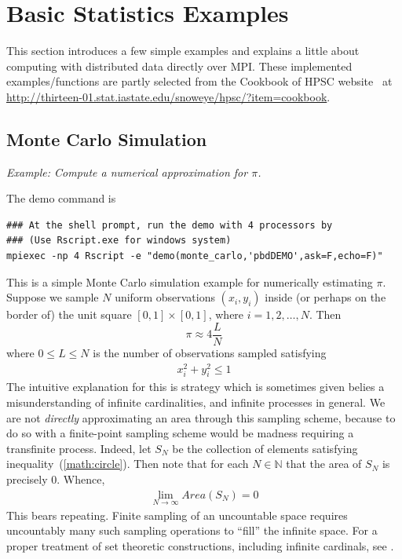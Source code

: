 \chapter[Basic Statistics Examples]{Basic Statistics Examples}
\label{sec:statistics_examples}

This section introduces a few simple examples and explains a little about computing with 
distributed data directly over MPI. 
These implemented examples/functions are partly
selected from the Cookbook of HPSC website~\citep{hpsc2011} at
\url{http://thirteen-01.stat.iastate.edu/snoweye/hpsc/?item=cookbook}.



\section[Monte Carlo Simulation]{Monte Carlo Simulation}%
\label{sec:monte_carlo}

\emph{Example:  Compute a numerical approximation for $\pi$.}

The demo command is
\begin{lstlisting}
### At the shell prompt, run the demo with 4 processors by
### (Use Rscript.exe for windows system)
mpiexec -np 4 Rscript -e "demo(monte_carlo,'pbdDEMO',ask=F,echo=F)"
\end{lstlisting}

This is a simple Monte Carlo simulation example for numerically estimating $\pi$.
Suppose we sample $N$ uniform observations $(x_i, y_i)$ inside (or perhaps on the border of) the unit square $[0, 1]\times [0,1]$,
where $i = 1, 2, \ldots, N$.  Then
\begin{equation}
\pi \approx 4\frac{L}{N}
\label{eqn:pi}
\end{equation}
where $0\leq L\leq N$ is the number of observations sampled satisfying
\begin{align}
x_i^2+y_i^2 \leq 1\label{math:circle}
\end{align}
The intuitive explanation for this is strategy which is sometimes given belies a misunderstanding of infinite cardinalities, and infinite processes in general.  We are not \emph{directly} approximating an area through this sampling scheme, because to do so with a finite-point sampling scheme would be madness requiring a transfinite process.  Indeed, let $S_N$ be the collection of elements satisfying inequality~(\ref{math:circle}).  Then note that for each $N\in\mathbb{N}$ that the area of $S_N$ is precisely 0.  Whence,
\begin{align*}
\lim_{N\rightarrow\infty} Area(S_N) = 0
\end{align*}
This bears repeating.  Finite sampling of an uncountable space requires uncountably many such sampling operations to ``fill'' the infinite space.  For a proper treatment of set theoretic constructions, including infinite cardinals, see \citep{kunen}.

